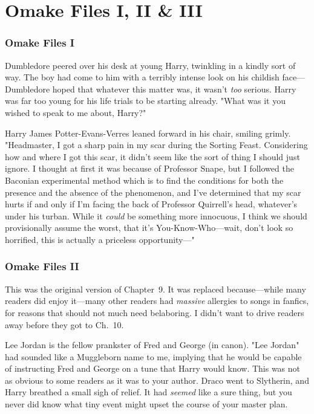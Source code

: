 \chapter{Omake Files I, II \& III}

\subsection{Omake Files I}
Dumbledore peered over his desk at young Harry, twinkling in a kindly sort of
way. The boy had come to him with a terribly intense look on his childish
face---Dumbledore hoped that whatever this matter was, it wasn't \emph{too}
serious. Harry was far too young for his life trials to be starting already.
"What was it you wished to speak to me about, Harry?"

Harry James Potter-Evans-Verres leaned forward in his chair, smiling grimly.
"Headmaster, I got a sharp pain in my scar during the Sorting Feast.
Considering how and where I got this scar, it didn't seem like the sort of
thing I should just ignore. I thought at first it was because of Professor
Snape, but I followed the Baconian experimental method which is to find the
conditions for both the presence and the absence of the phenomenon, and I've
determined that my scar hurts if and only if I'm facing the back of Professor
Quirrell's head, whatever's under his turban. While it \emph{could} be
something more innocuous, I think we should provisionally assume the worst,
that it's You-Know-Who---wait, don't look so horrified, this is actually a
priceless opportunity---"
\sbreak
\subsection{Omake Files II}
This was the original version of Chapter~9. It was replaced because---while
many readers did enjoy it---many other readers had \emph{massive} allergies to
songs in fanfics, for reasons that should not much need belaboring. I didn't
want to drive readers away before they got to Ch.~10.

Lee Jordan is the fellow prankster of Fred and George (in canon). "Lee Jordan"
had sounded like a Muggleborn name to me, implying that he would be capable of
instructing Fred and George on a tune that Harry would know. This was not as
obvious to some readers as it was to your author.
\sbreak
Draco went to Slytherin, and Harry breathed a small sigh of relief. It had
\emph{seemed} like a sure thing, but you never did know what tiny event might
upset the course of your master plan.

